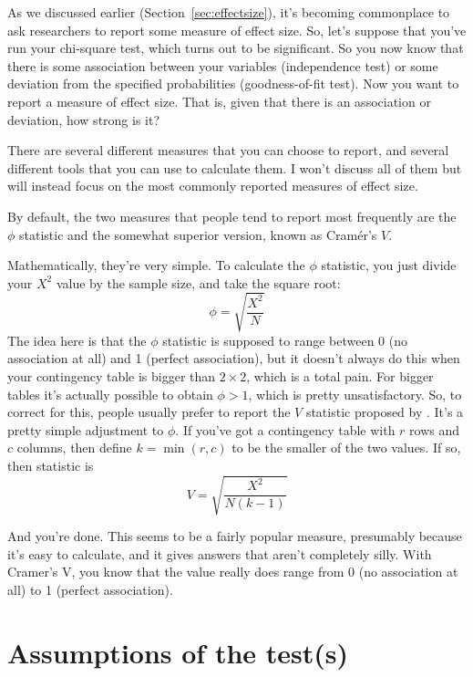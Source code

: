 As we discussed earlier (Section~\ref{sec:effectsize}), it's becoming commonplace to ask researchers to report some measure of effect size. So, let's suppose that you've run your chi-square test, which turns out to be significant. So you now know that there is some association between your variables (independence test) or some deviation from the specified probabilities (goodness-of-fit test). Now you want to report a measure of effect size. That is, given that there is an association or deviation, how strong is it?

There are several different measures that you can choose to report, and several different tools that you can use to calculate them. I won't discuss all of them but will instead focus on the most commonly reported measures of effect size. 

By default, the two measures that people tend to report most frequently are the $\phi$ statistic and the somewhat superior version, known as  Cram\'er's $V$. 

\vspace{0.5cm}
\begin{mdframed}[style=MyFrame,nobreak=true]
Mathematically, they're very simple. To calculate the $\phi$ statistic, you just divide your $X^2$ value by the sample size, and take the square root:
$$
\phi = \sqrt{\frac{X^2}{N}}
$$
The idea here is that the $\phi$ statistic is supposed to range between 0 (no association at all) and 1 (perfect association), but it doesn't always do this when your contingency table is bigger than $2 \times 2$, which is a total pain. For bigger tables it's actually possible to obtain $\phi>1$, which is pretty unsatisfactory. So, to correct for this, people usually prefer to report the $V$ statistic proposed by \textcite{Cramer1946}. It's a pretty simple adjustment to $\phi$. If you've got a contingency table with $r$ rows and $c$ columns, then define $k = \min(r,c)$ to be the smaller of the two values. If so, then  statistic is
$$
V = \sqrt{\frac{X^2}{N(k-1)}}
$$
\end{mdframed}

And you're done. This seems to be a fairly popular measure, presumably because it's easy to calculate, and it gives answers that aren't completely silly. With Cramer’s V, you know that the value really does range from 0 (no association at all) to 1 (perfect association). 


\section{Assumptions of the test(s)~\label{sec:chisqassumptions}}

